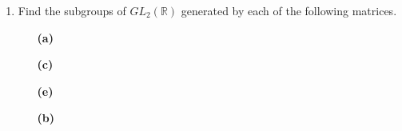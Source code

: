{\begin{enumerate}
\begin{enumerate}
 \bf\item\rm
The subgroup of ${\mathbb C}^\ast$ generated by $2i$
 
 \bf\item\rm
The subgroup of ${\mathbb C}^\ast$ generated by $(1 + i) / \sqrt{2}$
 
 \bf\item\rm
The subgroup of ${\mathbb C}^\ast$ generated by $(1 + \sqrt{3}\, i) / 2$
 
\end{enumerate}
 
 
\bf\item\rm
Find the subgroups of $GL_2( {\mathbb R })$ generated by each of the
following matrices. 
 
 
\vspace{3pt}        %
 
\hspace{-7pt}
\begin{minipage}[t]{4.6in}
\noindent
\begin{minipage}[t]{2.25in}
\begin{itemize}
 
 \item[{\bf (a)}]
 
 \item[{\bf (c)}]
 
 \item[{\bf (e)}]
 
\end{itemize}
\end{minipage} \hfill
\begin{minipage}[t]{2.25in}
\begin{itemize}
 
 \item[{\bf (b)}]
 

\end{itemize}
\end{minipage}
\end{minipage}
\end{enumerate}}
